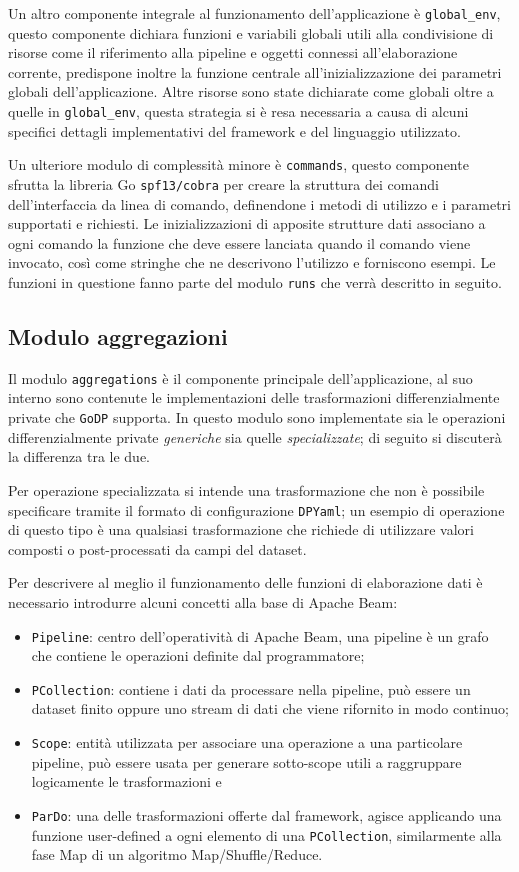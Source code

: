 Un altro componente integrale al funzionamento dell'applicazione è \texttt{global\_env}, questo componente dichiara funzioni e variabili globali utili alla condivisione di risorse come il riferimento alla pipeline e oggetti connessi all'elaborazione corrente, predispone inoltre la funzione centrale all'inizializzazione dei parametri globali dell'applicazione.
Altre risorse sono state dichiarate come globali oltre a quelle in \texttt{global\_env}, questa strategia si è resa necessaria a causa di alcuni specifici dettagli implementativi del framework e del linguaggio utilizzato.

Un ulteriore modulo di complessità minore è \texttt{commands}, questo componente sfrutta la libreria Go \texttt{spf13/cobra} per creare la struttura dei comandi dell'interfaccia da linea di comando, definendone i metodi di utilizzo e i parametri supportati e richiesti. Le inizializzazioni di apposite strutture dati associano a ogni comando la funzione che deve essere lanciata quando il comando viene invocato, così come stringhe che ne descrivono l'utilizzo e forniscono esempi. Le funzioni in questione fanno parte del modulo \texttt{runs} che verrà descritto in seguito.

\subsection{Modulo aggregazioni}
Il modulo \texttt{aggregations} è il componente principale dell'applicazione, al suo interno sono contenute le implementazioni delle trasformazioni differenzialmente private che \texttt{GoDP} supporta. In questo modulo sono implementate sia le operazioni differenzialmente private \textit{generiche} sia quelle \textit{specializzate}; di seguito si discuterà la differenza tra le due.

Per operazione specializzata si intende una trasformazione che non è possibile specificare tramite il formato di configurazione \texttt{DPYaml}; un esempio di operazione di questo tipo è una qualsiasi trasformazione che richiede di utilizzare valori composti o post-processati da campi del dataset.

Per descrivere al meglio il funzionamento delle funzioni di elaborazione dati è necessario introdurre alcuni concetti alla base di Apache Beam:
\begin{itemize}
    \item \texttt{Pipeline}: centro dell'operatività di Apache Beam, una pipeline è un grafo che contiene le operazioni definite dal programmatore;
    \item \texttt{PCollection}: contiene i dati da processare nella pipeline, può essere un dataset finito oppure uno stream di dati che viene rifornito in modo continuo;
    \item \texttt{Scope}: entità utilizzata per associare una operazione a una particolare pipeline, può essere usata per generare sotto-scope utili a raggruppare logicamente le trasformazioni e
    \item \texttt{ParDo}: una delle trasformazioni offerte dal framework, agisce applicando una funzione user-defined a ogni elemento di una \texttt{PCollection}, similarmente alla fase Map di un algoritmo Map/Shuffle/Reduce.
\end{itemize}

